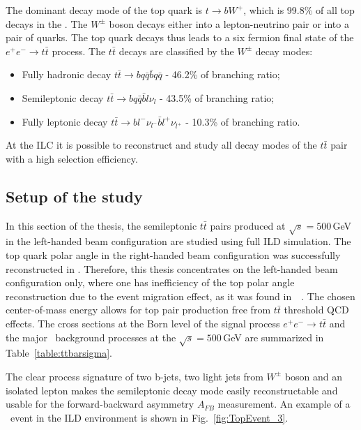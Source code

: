 The dominant decay mode of the top quark is $t\to bW^+$, which is 99.8\% of all top decays in the \sm. The $W^\pm$ boson decays either into a lepton-neutrino pair or into a pair of quarks. The top quark decays thus leads to a six fermion final state of the $e^+e^-\to t\bar{t}$ process.
The $t\bar{t}$  decays are classified by the $W^\pm$ decay modes:
\begin{itemize}
	\item Fully hadronic decay $t\bar{t} \to bq\bar{q} \bar{b} q\bar{q}$ -  46.2\% of branching ratio;
	\item Semileptonic decay $t\bar{t} \to bq\bar{q} \bar{b} l\nu_l$ - 43.5\% of branching ratio;
	\item Fully leptonic decay $t\bar{t} \to b l^- \nu_{l^-} \bar{b} l^+\nu_{l^+}$ - 10.3\% of branching ratio.	
\end{itemize}


At the ILC it is possible to reconstruct and study all decay modes of the $t\bar{t}$ pair with a high selection efficiency.
\subsection{Setup of the study}
In this section of the thesis, the semileptonic $t\bar{t}$ pairs produced at $\sqrt{s}=500$\,GeV in the left-handed beam configuration are studied using full ILD simulation.
The top quark polar angle in the right-handed beam configuration was  successfully reconstructed in \cite{bib:Doublet}\cite{bib:ILCTOP}.
Therefore, this thesis concentrates on the left-handed beam configuration only, where one has inefficiency of the top polar angle reconstruction due to the event migration effect, as it was found in~\cite{bib:Doublet}~\cite{bib:Jeremy}.
The chosen center-of-mass energy allows for top pair production free from $t\bar{t}$ threshold QCD effects.
The cross sections at the Born level of the signal process $e^+e^- \to t\bar{t}$ and the major \sm\ background processes at the $\sqrt{s} = 500$\,GeV are summarized in Table~\ref{table:ttbarsigma}.

The clear process signature of two b-jets, two light jets from $W^\pm$ boson and an isolated lepton makes the semileptonic decay mode easily reconstructable and usable for the forward-backward asymmetry $A_{FB}$ measurement. 
An example of a \ttbar\ event in the ILD environment is shown in Fig.~\ref{fig:TopEvent_3}.

